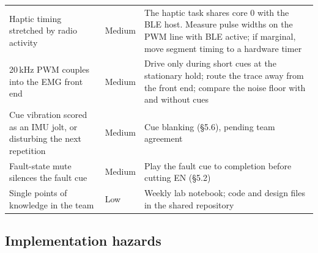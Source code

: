 \documentclass[11pt]{article}
\begin{document}
\begin{table}[H]
\begin{tabularx}{\linewidth}{@{}p{40mm} p{14mm} X@{}}
Haptic timing stretched by radio activity & Medium & The haptic task shares core 0 with the BLE host. Measure pulse widths on the PWM line with BLE active; if marginal, move segment timing to a hardware timer \\
20\,kHz PWM couples into the EMG front end & Medium & Drive only during short cues at the stationary hold; route the trace away from the front end; compare the noise floor with and without cues \\
Cue vibration scored as an IMU jolt, or disturbing the next repetition & Medium & Cue blanking (\S5.6), pending team agreement \\
Fault-state mute silences the fault cue & Medium & Play the fault cue to completion before cutting EN (\S5.2) \\
Single points of knowledge in the team & Low & Weekly lab notebook; code and design files in the shared repository \\
\bottomrule
\end{tabularx}
\end{table}

\subsection{Implementation hazards}
\end{document}
